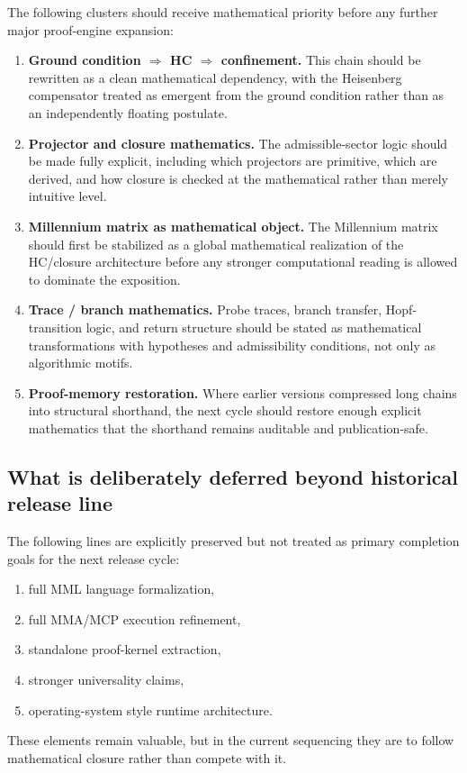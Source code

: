 \documentclass[12pt,a4paper]{article}
\DeclareRobustCommand{\QSCver}[1]{archival stage}
\renewcommand{\QSCver}[1]{historical release line}
\begin{document}
The following clusters should receive mathematical priority before any further major proof-engine expansion:
\begin{enumerate}[leftmargin=2em,label=\textbf{PC\arabic*:}]
 \item \textbf{Ground condition $\Rightarrow$ HC $\Rightarrow$ confinement.} This chain should be rewritten as a clean mathematical dependency, with the Heisenberg compensator treated as emergent from the ground condition rather than as an independently floating postulate.
 \item \textbf{Projector and closure mathematics.} The admissible-sector logic should be made fully explicit, including which projectors are primitive, which are derived, and how closure is checked at the mathematical rather than merely intuitive level.
 \item \textbf{Millennium matrix as mathematical object.} The Millennium matrix should first be stabilized as a global mathematical realization of the HC/closure architecture before any stronger computational reading is allowed to dominate the exposition.
 \item \textbf{Trace / branch mathematics.} Probe traces, branch transfer, Hopf-transition logic, and return structure should be stated as mathematical transformations with hypotheses and admissibility conditions, not only as algorithmic motifs.
 \item \textbf{Proof-memory restoration.} Where earlier versions compressed long chains into structural shorthand, the next cycle should restore enough explicit mathematics that the shorthand remains auditable and publication-safe.
\end{enumerate}

\subsection*{What is deliberately deferred beyond \QSCver{v2.27.0}}

The following lines are explicitly preserved but not treated as primary completion goals for the next release cycle:
\begin{enumerate}[leftmargin=2em,label=\textbf{D\arabic*:}]
 \item full MML language formalization,
 \item full MMA/MCP execution refinement,
 \item standalone proof-kernel extraction,
 \item stronger universality claims,
 \item operating-system style runtime architecture.
\end{enumerate}
These elements remain valuable, but in the current sequencing they are to follow mathematical closure rather than compete with it.
\end{document}
